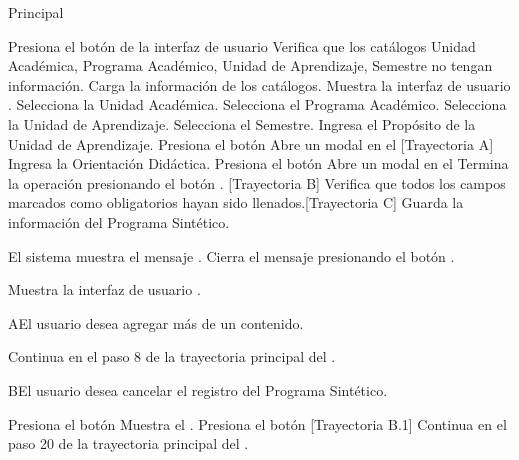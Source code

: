 \begin{UCtrayectoria}{Principal}

    \UCpaso[\UCactor] Presiona el botón  de la interfaz de usuario 
    \UCpaso Verifica que los catálogos Unidad Académica, Programa Académico, Unidad de Aprendizaje, Semestre no tengan información.
    \UCpaso Carga la información de los catálogos.
    \UCpaso Muestra la interfaz de usuario .
    \UCpaso[\UCactor] Selecciona la Unidad Académica.
    \UCpaso[\UCactor] Selecciona el Programa Académico.
    \UCpaso[\UCactor] Selecciona la Unidad de Aprendizaje.
    \UCpaso[\UCactor] Selecciona el Semestre.
    \UCpaso[\UCactor] Ingresa el Propósito de la Unidad de Aprendizaje.
    \UCpaso[\UCactor] Presiona el botón 
    \UCpaso Abre un modal en el  [Trayectoria A]
    \UCpaso[\UCactor] Ingresa la Orientación Didáctica.
    \UCpaso[\UCactor] Presiona el botón 
    \UCpaso Abre un modal en el 
    \UCpaso[\UCactor] Termina la operación presionando el botón . [Trayectoria B]
    \UCpaso Verifica que todos los campos marcados como obligatorios hayan sido llenados.[Trayectoria C]
    \UCpaso Guarda la información del Programa Sintético.

    \UCpaso El sistema muestra el mensaje .
    \UCpaso[\UCactor] Cierra el mensaje presionando el botón .



    \UCpaso Muestra la interfaz de usuario .
\end{UCtrayectoria}


\begin{UCtrayectoriaA}{A}{El usuario desea agregar más de un contenido.}

    \UCpaso Continua en el paso 8 de la trayectoria principal del .

\end{UCtrayectoriaA}

\begin{UCtrayectoriaA}{B}{El usuario desea cancelar el registro del Programa Sintético.}

    \UCpaso[\UCactor] Presiona el botón 
    \UCpaso Muestra el .
    \UCpaso[\UCactor] Presiona el botón  [Trayectoria B.1]
    \UCpaso Continua en el paso 20 de la trayectoria principal del .

\end{UCtrayectoriaA}

